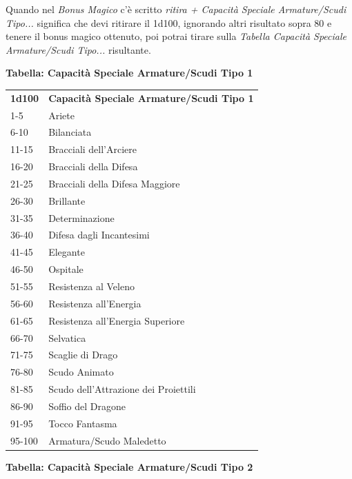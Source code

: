 \begin{multicols}{2}
\medskip

Quando nel \textit{Bonus Magico} c'è scritto \textit{ritira + Capacità Speciale Armature/Scudi Tipo...} significa che devi ritirare il 1d100, ignorando altri risultato sopra 80 e tenere il bonus magico ottenuto, poi potrai tirare sulla \textit{Tabella Capacità Speciale Armature/Scudi Tipo...} risultante.

\textbf{Tabella: Capacità Speciale Armature/Scudi Tipo 1}

\begin{tabularx}{0.45\textwidth}{lX}
\textbf{1d100} & \textbf{Capacità Speciale Armature/Scudi Tipo 1}\\
1-5 & Ariete\\
6-10 &Bilanciata\\
11-15& Bracciali dell'Arciere\\
16-20& Bracciali della Difesa\\
21-25& Bracciali della Difesa Maggiore\\
26-30& Brillante\\
31-35& Determinazione\\
36-40& Difesa dagli Incantesimi\\
41-45& Elegante\\
46-50& Ospitale\\
51-55& Resistenza al Veleno\\
56-60& Resistenza all'Energia\\
61-65& Resistenza all'Energia Superiore\\
66-70& Selvatica\\
71-75& Scaglie di Drago\\
76-80& Scudo Animato\\
81-85& Scudo dell'Attrazione dei Proiettili\\
86-90& Soffio del Dragone\\
91-95& Tocco Fantasma\\
95-100 & Armatura/Scudo Maledetto\\
\end{tabularx}

\medskip

\textbf{Tabella: Capacità Speciale Armature/Scudi Tipo 2}


\end{multicols}
